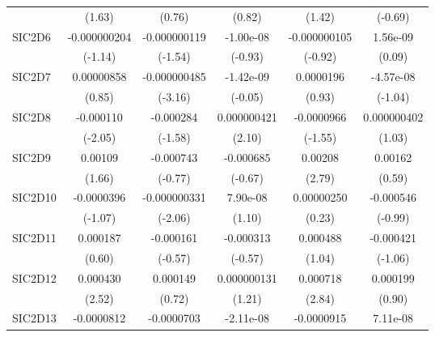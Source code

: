 \begin{table}[htbp]
\begin{tabular}{l*{5}{c}}
            &      (1.63)         &      (0.76)         &      (0.82)         &      (1.42)         &     (-0.69)         \\
SIC2D6      &-0.000000204         &-0.000000119         &   -1.00e-08         &-0.000000105         &    1.56e-09         \\
            &     (-1.14)         &     (-1.54)         &     (-0.93)         &     (-0.92)         &      (0.09)         \\
SIC2D7      &  0.00000858         &-0.000000485\sym{**} &   -1.42e-09         &   0.0000196         &   -4.57e-08         \\
            &      (0.85)         &     (-3.16)         &     (-0.05)         &      (0.93)         &     (-1.04)         \\
SIC2D8      &   -0.000110\sym{*}  &   -0.000284         & 0.000000421\sym{*}  &  -0.0000966         & 0.000000402         \\
            &     (-2.05)         &     (-1.58)         &      (2.10)         &     (-1.55)         &      (1.03)         \\
SIC2D9      &     0.00109         &   -0.000743         &   -0.000685         &     0.00208\sym{**} &     0.00162         \\
            &      (1.66)         &     (-0.77)         &     (-0.67)         &      (2.79)         &      (0.59)         \\
SIC2D10     &  -0.0000396         &-0.000000331\sym{*}  &    7.90e-08         &  0.00000250         &   -0.000546         \\
            &     (-1.07)         &     (-2.06)         &      (1.10)         &      (0.23)         &     (-0.99)         \\
SIC2D11     &    0.000187         &   -0.000161         &   -0.000313         &    0.000488         &   -0.000421         \\
            &      (0.60)         &     (-0.57)         &     (-0.57)         &      (1.04)         &     (-1.06)         \\
SIC2D12     &    0.000430\sym{*}  &    0.000149         & 0.000000131         &    0.000718\sym{**} &    0.000199         \\
            &      (2.52)         &      (0.72)         &      (1.21)         &      (2.84)         &      (0.90)         \\
SIC2D13     &  -0.0000812         &  -0.0000703         &   -2.11e-08         &  -0.0000915         &    7.11e-08         \\

\end{tabular}
\end{table}
